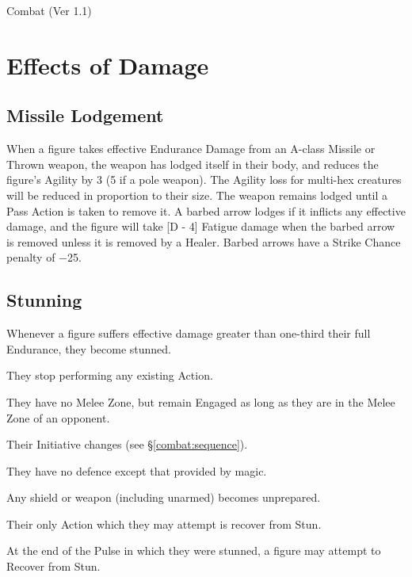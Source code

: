 \begin{Chapter}{Combat (Ver 1.1)}
\section{Effects of Damage}
\label{combat:effects}

\subsection{Missile Lodgement}

When a figure takes effective Endurance Damage from an A-class Missile
or Thrown weapon, the weapon has lodged itself in their body, and
reduces the figure’s Agility by 3 (5 if a pole weapon).  The Agility
loss for multi-hex creatures will be reduced in proportion to their
size.  The weapon remains lodged until a Pass Action is taken to
remove it. A barbed arrow lodges if it inflicts any effective damage,
and the figure will take [D - 4] Fatigue damage when the barbed arrow
is removed unless it is removed by a Healer.  Barbed arrows have a
Strike Chance penalty of −25.

\subsection{Stunning}

Whenever a figure suffers effective damage greater than one-third
their full Endurance, they become stunned.

\begin{Itemize}

\item They stop performing any existing Action.  

\item They have no Melee Zone, but remain Engaged as long as they are
  in the Melee Zone of an opponent.

\item Their Initiative changes (see \S\ref{combat:sequence}).

\item They have no defence except that provided by magic.

\item Any shield or weapon (including unarmed) becomes unprepared.

\item Their only Action which they may attempt is recover from Stun.

\item At the end of the Pulse in which they were stunned, a figure may
  attempt to Recover from Stun.


\end{Itemize}
\end{Chapter}
